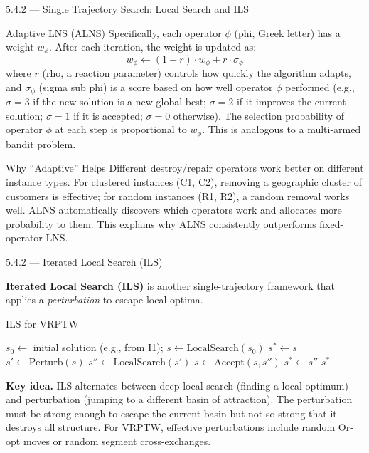\documentclass[aspectratio=169,10pt]{beamer}
\begin{document}
\begin{frame}[allowframebreaks]{5.4.2 --- Single Trajectory Search: Local Search and ILS}
\begin{block}{Adaptive LNS (ALNS)}
\medskip
Specifically, each operator $\phi$ (phi, Greek letter) has a weight $w_\phi$.
After each iteration, the weight is updated as:
\[
  w_\phi \leftarrow (1 - r) \cdot w_\phi + r \cdot \sigma_\phi
\]
where $r$ (rho, a reaction parameter) controls how quickly the algorithm adapts,
and $\sigma_\phi$ (sigma sub phi) is a score based on how well operator $\phi$
performed (e.g., $\sigma=3$ if the new solution is a new global best; $\sigma=2$
if it improves the current solution; $\sigma=1$ if it is accepted; $\sigma=0$
otherwise).  The selection probability of operator $\phi$ at each step is
proportional to $w_\phi$.  This is analogous to a multi-armed bandit problem.
\end{block}

\begin{alertblock}{Why ``Adaptive'' Helps}
Different destroy/repair operators work better on different instance types.  For
clustered instances (C1, C2), removing a geographic cluster of customers is
effective; for random instances (R1, R2), a random removal works well.  ALNS
automatically discovers which operators work and allocates more probability to them.
This explains why ALNS consistently outperforms fixed-operator LNS.
\end{alertblock}

\end{frame}

\begin{frame}[allowframebreaks]{5.4.2 --- Iterated Local Search (ILS)}

\textbf{Iterated Local Search (ILS)} is another single-trajectory framework that
applies a \emph{perturbation} to escape local optima.

\begin{block}{ILS for VRPTW}
\begin{algorithmic}[1]
\State $s_0 \leftarrow$ initial solution (e.g., from I1); $s \leftarrow \text{LocalSearch}(s_0)$
\State $s^* \leftarrow s$
\Repeat
  \State $s' \leftarrow \text{Perturb}(s)$
  \State $s'' \leftarrow \text{LocalSearch}(s')$
  \State $s \leftarrow \text{Accept}(s, s'')$
    \State $s^* \leftarrow s''$
  \EndIf
{}
\State \Return $s^*$
\end{algorithmic}
\end{block}

\textbf{Key idea.}  ILS alternates between deep local search (finding a local
optimum) and perturbation (jumping to a different basin of attraction).  The
perturbation must be strong enough to escape the current basin but not so strong
that it destroys all structure.  For VRPTW, effective perturbations include
random Or-opt moves or random segment cross-exchanges.

\end{frame}
\end{document}

